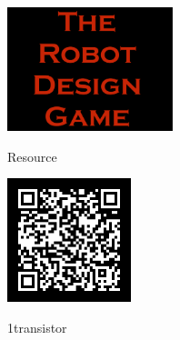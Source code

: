\documentclass[11pt]{article}
\begin{document}
\color{white}            
    
    \begin{center}
        \vfill
        \vfill
        \vfill

        \includegraphics[height=3.6cm]{rdg_logo}%
        
        \vfill

        

Resource



        \includegraphics[height=3.6cm]{1transistor-qr}%

        1transistor

        \vfill
    \end{center}
\end{document}
